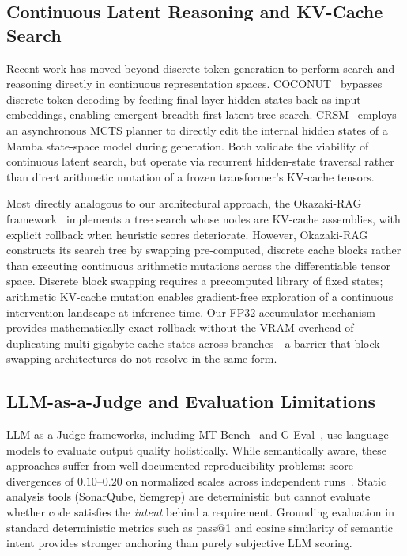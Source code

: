 \documentclass{article}
\begin{document}
\subsection{Continuous Latent Reasoning and KV-Cache Search}

Recent work has moved beyond discrete token generation to perform search and reasoning directly in continuous representation spaces. COCONUT~\cite{hao2025coconut} bypasses discrete token decoding by feeding final-layer hidden states back as input embeddings, enabling emergent breadth-first latent tree search. CRSM~\cite{crsm2025} employs an asynchronous MCTS planner to directly edit the internal hidden states of a Mamba state-space model during generation. Both validate the viability of continuous latent search, but operate via recurrent hidden-state traversal rather than direct arithmetic mutation of a frozen transformer's KV-cache tensors.

Most directly analogous to our architectural approach, the Okazaki-RAG framework~\cite{okazakirag2025} implements a tree search whose nodes are KV-cache assemblies, with explicit rollback when heuristic scores deteriorate. However, Okazaki-RAG constructs its search tree by swapping pre-computed, discrete cache blocks rather than executing continuous arithmetic mutations across the differentiable tensor space. Discrete block swapping requires a precomputed library of fixed states; arithmetic KV-cache mutation enables gradient-free exploration of a continuous intervention landscape at inference time. Our FP32 accumulator mechanism provides mathematically exact rollback without the VRAM overhead of duplicating multi-gigabyte cache states across branches---a barrier that block-swapping architectures do not resolve in the same form.

\subsection{LLM-as-a-Judge and Evaluation Limitations}

LLM-as-a-Judge frameworks, including MT-Bench~\cite{zheng2023judging} and G-Eval~\cite{liu2023geval}, use language models to evaluate output quality holistically. While semantically aware, these approaches suffer from well-documented reproducibility problems: score divergences of $0.10$--$0.20$ on normalized scales across independent runs~\cite{llmasjudge2025limitations}. Static analysis tools (SonarQube, Semgrep) are deterministic but cannot evaluate whether code satisfies the \emph{intent} behind a requirement. Grounding evaluation in standard deterministic metrics such as pass@1 and cosine similarity of semantic intent provides stronger anchoring than purely subjective LLM scoring.
\end{document}
